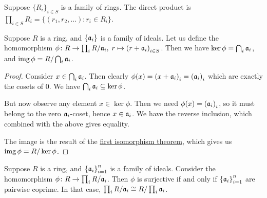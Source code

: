 \begin{definition}
    Suppose \({\{R_i\}}_{i \in S}\) is a family of rings.
    The direct product is \(\prod_{i \in S} R_i = \{(r_1,r_2,\hdots) : r_i \in R_i\}\).
\end{definition}
\begin{lemma}\label{lem:ideal-projections}
    Suppose \(R\) is a ring, and \(\{\mathfrak{a}_i\}\) is a family of ideals.
    Let us define the homomorphism \(\phi\colon R\to\prod_i R/\mathfrak{a}_i,\;r\mapsto{(r+\mathfrak{a}_i)}_{i \in S}\).
    Then we have \(\ker\phi = \bigcap_i \mathfrak{a}_i\),
    and \(\operatorname{img}\phi = R/\bigcap_i \mathfrak{a}_i\).
\end{lemma}
\begin{proof}
    Consider \(x \in \bigcap_i \mathfrak{a}_i\).
    Then clearly \(\phi(x) = {(x+\mathfrak{a}_i)}_i = {(\mathfrak{a}_i)}_i\)
    which are exactly the cosets of 0.
    We have \(\bigcap_i \mathfrak{a}_i \subseteq \ker\phi\).

    But now observe any element \(x \in \ker\phi\).
    Then we need \(\phi(x) = {(\mathfrak{a}_i)}_i\),
    so it must belong to the zero \(\mathfrak{a}_i\)-coset,
    hence \(x \in \mathfrak{a}_i\).
    We have the reverse inclusion,
    which combined with the above gives equality.

    The image is the result of the
    \hyperref[thm:iso-1-mod]{first isomorphism theorem},
    which gives us \(\operatorname{img}\phi = R/\ker\phi\).
\end{proof}
\begin{theorem}\label{thm:chinese}
    Suppose \(R\) is a ring, and \({\{\mathfrak{a}_i\}}_{i=1}^n\) is a family of ideals.
    Consider the homomorphism \(\phi\colon R\to\prod_i R/\mathfrak{a}_i\).
    Then \(\phi\) is surjective if and only if \({\{\mathfrak{a}_i\}}_{i=1}^n\) are pairwise coprime.
    In that case, \(\prod_i R/\mathfrak{a}_i \cong R/\prod_i \mathfrak{a}_i\).
\end{theorem}
